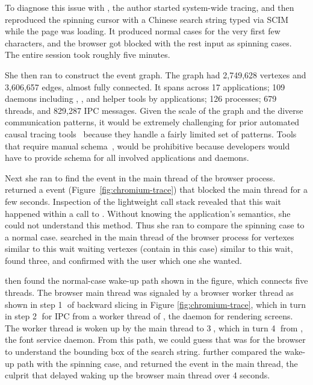 To diagnose this issue with \xxx, the author started system-wide tracing, and
then reproduced the spinning cursor with a Chinese search string typed via SCIM
while the page was loading. It produced normal cases for the very first few
characters, and the browser got blocked with the rest input as spinning cases.
The entire session took roughly five minutes.

She then ran \xxx to construct the event graph.  The graph had 2,749,628
vertexes and 3,606,657 edges, almost fully connected.  It spans across 17
applications; 109 daemons including , , 
and helper tools by applications; 126 processes; 679 threads, and 829,287 IPC
messages.  Given the scale of the graph and the diverse communication patterns,
it would be extremely challenging for prior automated causal tracing
tools~\cite{aguilera2003performance, zhang2013panappticon, attariyan2012x,
cohen2004correlating} because they handle a fairly limited set of patterns.
Tools that require manual schema~\cite{barham2004using, reynolds2006pip}, would
be prohibitive because developers would have to provide schema for all involved
applications and daemons.

\begin{figure*}[p]
    \centering
	 
    \caption{Chromium case study.}
    \label{fig:chromium-trace}
\end{figure*}

Next she ran \xxx to find the event in the main thread of the browser process.
\xxx returned a  event (Figure~\ref{fig:chromium-trace})
that blocked the main thread for a few seconds.  Inspection of the lightweight
call stack revealed that this wait happened within a call to
.  Without knowing the
application's semantics, she could not understand this method.  Thus she ran
\xxx to compare the spinning case to a normal case.  \xxx searched in the main
thread of the browser process for vertexes similar to this wait waiting
vertexes (contain  in this case) similar to
this wait, found three, and confirmed with the user which one she wanted.

\xxx then found the normal-case wake-up path shown in the figure, which
connects five threads.  The browser main thread was signaled by a browser
worker thread as shown in step \textcircled{1} of backward slicing in Figure
\ref{fig:chromium-trace}, which in turn  in step \textcircled{2}
for IPC from a worker thread of , the daemon for rendering screens.
The  worker thread is woken up by the  main thread to
 \textcircled{3}, which in turn  \textcircled{4}
from , the font service daemon.  From this path, we could guess that
 was for the browser to understand the bounding box of
the search string.  \xxx further compared the wake-up path with the spinning
case, and returned the  event in the  main
thread, the culprit that delayed waking up the browser main thread over 4
seconds.

